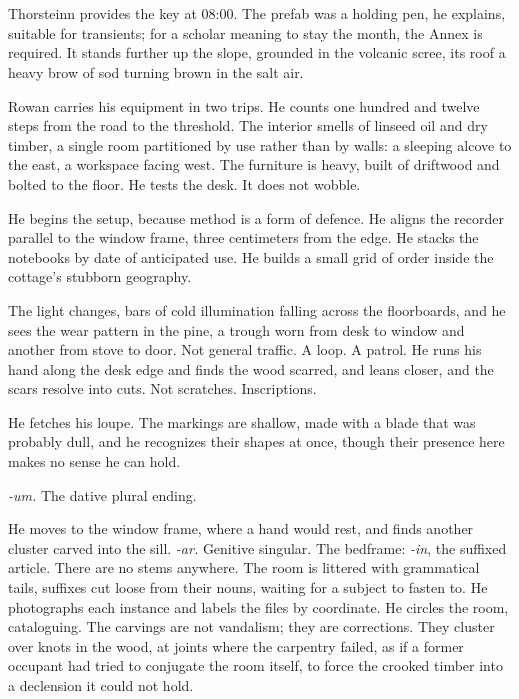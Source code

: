 \documentclass[11pt,oneside]{book}
\begin{document}
\chapter{}

Thorsteinn provides the key at 08:00. The prefab was a holding pen, he
explains, suitable for transients; for a scholar meaning to stay the
month, the Annex is required. It stands further up the slope, grounded
in the volcanic scree, its roof a heavy brow of sod turning brown in the
salt air.

Rowan carries his equipment in two trips. He counts one hundred and
twelve steps from the road to the threshold. The interior smells of
linseed oil and dry timber, a single room partitioned by use rather than
by walls: a sleeping alcove to the east, a workspace facing west. The
furniture is heavy, built of driftwood and bolted to the floor. He tests
the desk. It does not wobble.

He begins the setup, because method is a form of defence. He aligns the
recorder parallel to the window frame, three centimeters from the edge.
He stacks the notebooks by date of anticipated use. He builds a small
grid of order inside the cottage's stubborn geography.

The light changes, bars of cold illumination falling across the
floorboards, and he sees the wear pattern in the pine, a trough worn
from desk to window and another from stove to door. Not general traffic.
A loop. A patrol. He runs his hand along the desk edge and finds the
wood scarred, and leans closer, and the scars resolve into cuts. Not
scratches. Inscriptions.

He fetches his loupe. The markings are shallow, made with a blade that
was probably dull, and he recognizes their shapes at once, though their
presence here makes no sense he can hold.

\emph{-um.} The dative plural ending.

He moves to the window frame, where a hand would rest, and finds another
cluster carved into the sill. \emph{-ar.} Genitive singular. The
bedframe: \emph{-in}, the suffixed article. There are no stems anywhere.
The room is littered with grammatical tails, suffixes cut loose from
their nouns, waiting for a subject to fasten to. He photographs each
instance and labels the files by coordinate. He circles the room,
cataloguing. The carvings are not vandalism; they are corrections. They
cluster over knots in the wood, at joints where the carpentry failed, as
if a former occupant had tried to conjugate the room itself, to force
the crooked timber into a declension it could not hold.
\end{document}
